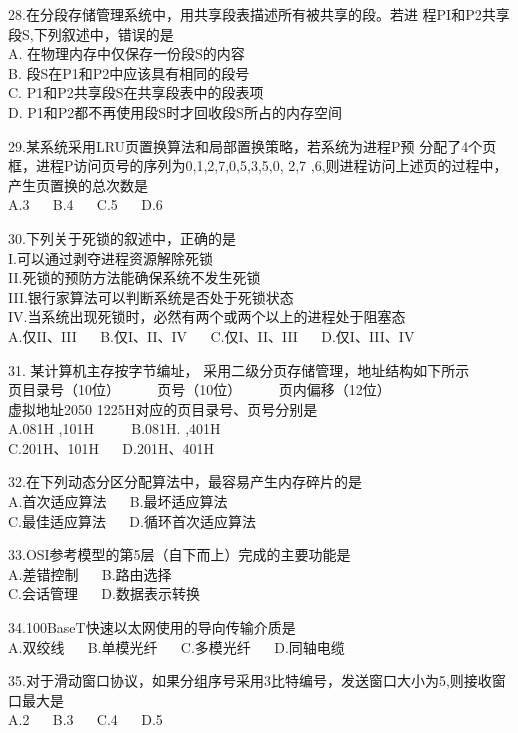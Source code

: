 28.在分段存储管理系统中，用共享段表描述所有被共享的段。若进
程PI和P2共享段S,下列叙述中，错误的是 \\
A. 在物理内存中仅保存一份段S的内容 \\
B. 段S在P1和P2中应该具有相同的段号 \\
C. P1和P2共享段S在共享段表中的段表项 \\
D. P1和P2都不再使用段S时才回收段S所占的内存空间

29.某系统采用LRU页置换算法和局部置换策略，若系统为进程P预
分配了4个页框，进程P访问页号的序列为0,1,2,7,0,5,3,5,0,
2,7 ,6,则进程访问上述页的过程中，产生页置换的总次数是 \\
A.3 $\quad$ B.4 $\quad$ C.5 $\quad$ D.6

30.下列关于死锁的叙述中，正确的是 \\
I.可以通过剥夺进程资源解除死锁 \\
II.死锁的预防方法能确保系统不发生死锁 \\
III.银行家算法可以判断系统是否处于死锁状态 \\
IV.当系统出现死锁时，必然有两个或两个以上的进程处于阻塞态 \\
A.仅II、III $\quad$ B.仅I、II、IV $\quad$ C.仅I、II、III $\quad$ D.仅I、III、IV

31. 某计算机主存按字节编址， 采用二级分页存储管理，地址结构如下所示 \\
页目录号（10位） $\qquad$ 页号（10位） $\qquad$ 页内偏移（12位） \\
虚拟地址2050 1225H对应的页目录号、页号分别是 \\
A.081H ,101H $\qquad$ B.081H. ,401H \\
C.201H、101H $\quad$ D.201H、401H

32.在下列动态分区分配算法中，最容易产生内存碎片的是 \\
A.首次适应算法 $\quad$ B.最坏适应算法 \\
C.最佳适应算法 $\quad$ D.循环首次适应算法

33.OSI参考模型的第5层（自下而上）完成的主要功能是 \\
A.差错控制 $\quad$ B.路由选择 \\
C.会话管理 $\quad$ D.数据表示转换

34.100BaseT快速以太网使用的导向传输介质是 \\
A.双绞线 $\quad$ B.单模光纤 $\quad$ C.多模光纤 $\quad$ D.同轴电缆

35.对于滑动窗口协议，如果分组序号采用3比特编号，发送窗口大小为5,则接收窗口最大是 \\
A.2 $\quad$ B.3 $\quad$ C.4 $\quad$ D.5

